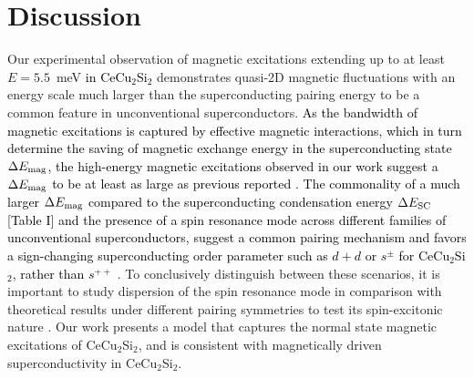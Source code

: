 \documentclass[aps,prl,onecolumn,amsmath,amssymb,superscriptaddress]{revtex4}
\newcommand{\ys}{\textcolor{black}}
\begin{document}

\section{Discussion}
Our experimental observation of magnetic excitations extending up to at least $E=5.5$~meV \ys{in CeCu$_2$Si$_2$} demonstrates quasi-2D magnetic fluctuations with an energy scale much larger than the superconducting pairing energy to be a common feature in unconventional superconductors. \ys{As the bandwidth of magnetic excitations is captured by effective magnetic interactions, which in turn determine the saving of magnetic exchange energy in the superconducting state  $\Delta E_{\rm mag}$, the high-energy magnetic excitations observed in our work suggest a $\Delta E_{\rm mag}$ to be at least as large as previous reported \cite{OStockert2011}. The commonality of a much larger $\Delta E_{\rm mag}$ compared to the superconducting condensation energy $\Delta E_{\rm SC}$ [Table I] and the presence of a spin resonance mode \cite{DJScalapino2012,MEschrig2006,GYu2009} across different families of unconventional superconductors, suggest a common pairing mechanism and favors a sign-changing superconducting order parameter such as $d+d$ \cite{GPang2017} or $s^{\pm}$ \cite{HIkeda2015,YLi2018} for CeCu$_2$Si$_2$, rather than $s^{++}$ \cite{RTazai2018}}. To conclusively distinguish between these scenarios, it is important to study dispersion of the spin resonance mode in comparison with theoretical results under different pairing symmetries to test its spin-excitonic nature \cite{YSong2016,YSong2020,WHong2020}. Our work presents a model that captures the normal state magnetic excitations of CeCu$_2$Si$_2$, and is consistent with magnetically driven superconductivity in CeCu$_2$Si$_2$. %
\end{document}
